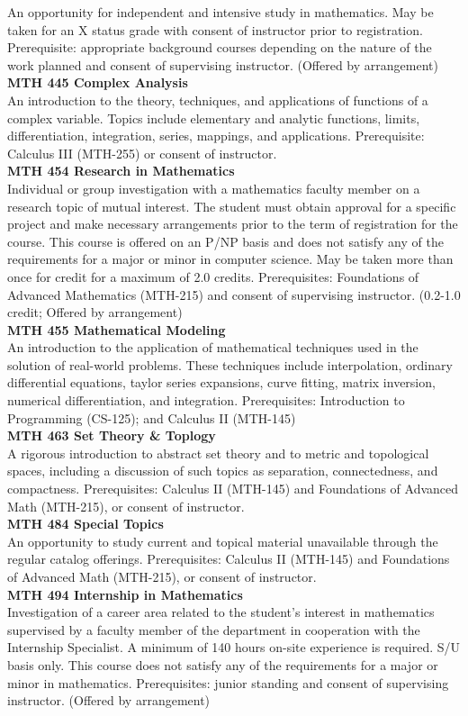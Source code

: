\documentclass[
  letterpaper,
]{scrbook}
\begin{document}
An opportunity for independent and intensive study in mathematics. May
be taken for an X status grade with consent of instructor prior to
registration. Prerequisite: appropriate background courses depending on
the nature of the work planned and consent of supervising instructor.
(Offered by arrangement)\\
\textbf{MTH 445 Complex Analysis}\\
An introduction to the theory, techniques, and applications of functions
of a complex variable. Topics include elementary and analytic functions,
limits, differentiation, integration, series, mappings, and
applications. Prerequisite: Calculus III (MTH-255) or consent of
instructor.\\
\textbf{MTH 454 Research in Mathematics}\\
Individual or group investigation with a mathematics faculty member on a
research topic of mutual interest. The student must obtain approval for
a specific project and make necessary arrangements prior to the term of
registration for the course. This course is offered on an P/NP basis and
does not satisfy any of the requirements for a major or minor in
computer science. May be taken more than once for credit for a maximum
of 2.0 credits. Prerequisites: Foundations of Advanced Mathematics
(MTH-215) and consent of supervising instructor. (0.2-1.0 credit;
Offered by arrangement)\\
\textbf{MTH 455 Mathematical Modeling}\\
An introduction to the application of mathematical techniques used in
the solution of real-world problems. These techniques include
interpolation, ordinary differential equations, taylor series
expansions, curve fitting, matrix inversion, numerical differentiation,
and integration. Prerequisites: Introduction to Programming (CS-125);
and Calculus II (MTH-145)\\
\textbf{MTH 463 Set Theory \& Toplogy}\\
A rigorous introduction to abstract set theory and to metric and
topological spaces, including a discussion of such topics as separation,
connectedness, and compactness. Prerequisites: Calculus II (MTH-145) and
Foundations of Advanced Math (MTH-215), or consent of instructor.\\
\textbf{MTH 484 Special Topics}\\
An opportunity to study current and topical material unavailable through
the regular catalog offerings. Prerequisites: Calculus II (MTH-145) and
Foundations of Advanced Math (MTH-215), or consent of instructor.\\
\textbf{MTH 494 Internship in Mathematics}\\
Investigation of a career area related to the student's interest in
mathematics supervised by a faculty member of the department in
cooperation with the Internship Specialist. A minimum of 140 hours
on-site experience is required. S/U basis only. This course does not
satisfy any of the requirements for a major or minor in mathematics.
Prerequisites: junior standing and consent of supervising instructor.
(Offered by arrangement)
\end{document}

